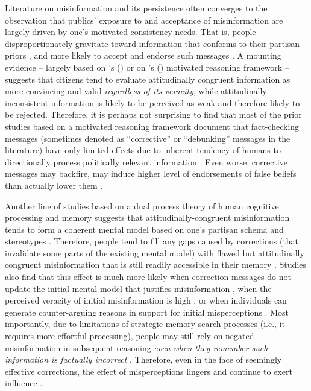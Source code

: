 \documentclass[man, 12pt, a4paper, nolmodern, noextraspace]{apa6}
\begin{document}
      Literature on misinformation and its persistence often converges to the observation that publics' exposure to and acceptance of misinformation are largely driven by one's motivated consistency needs. That is, people disproportionately gravitate toward information that conforms to their partisan priors \parencite{ weeks2014electoral, garrett2016driving}, and  more likely to accept and endorse such messages \parencite{nyhan2010corrections, guess2018selective}. A mounting evidence -- largely based on \citeauthor{kunda1990}'s (\citeyear{kunda1990}) or on \citeauthor{taber2006}'s (\citeyear{taber2006}) motivated reasoning framework -- suggests that citizens tend to evaluate attitudinally congruent information as more convincing and valid \emph{regardless of its veracity}, while attitudinally inconsistent information is likely to be perceived as weak and therefore likely to be rejected. Therefore, it is perhaps not surprising to find that most of the prior studies based on a motivated reasoning framework document that fact-checking messages (sometimes denoted as \enquote{corrective} or \enquote{debunking} messages in the literature) have only limited effects due to inherent tendency of humans to directionally process politically relevant information \parencite{thorson_2016, taber2006,flynn2017nature}. Even worse, corrective messages may backfire, may induce higher level of endorsements of false beliefs than actually lower them \parencites[e.g.,][]{nyhan2010corrections}[but see][]{Wood2018}.
      
      Another line of studies based on a dual process theory of human cognitive processing and memory suggests that attitudinally-congruent misinformation tends to form a coherent mental model based on one's partisan schema and stereotypes \parencite[e.g.,][]{garrett2013undermining, Lewandowsky_2012PSPI}. Therefore, people tend to fill any gaps caused by corrections (that invalidate some parts of the existing mental model) with flawed but attitudinally congruent misinformation that is still readily accessible in their memory \parencite{Lewandowsky_2012PSPI}. Studies also find that this effect is much more likely when correction messages do not update the initial mental model that justifies misinformation \parencite{Chan_debunking_meta_2017}, when the perceived veracity of initial misinformation is high \parencite[due to fluency bias in one's cognitive processing:][]{Lewandowsky_2012PSPI}, or when individuals can generate counter-arguing reasons in support for initial misperceptions \parencite{garrett2013undermining, Chan_debunking_meta_2017}. Most importantly, due to limitations of strategic memory search processes (i.e., it requires more effortful processing), people may still rely on negated misinformation in subsequent reasoning \emph{even when they remember such information is factually incorrect} \parencite{Lewandowsky_2012PSPI}. Therefore, even in the face of seemingly effective corrections, the effect of misperceptions lingers and continue to exert influence \parencite{thorson_2016}.  
      
\end{document}
